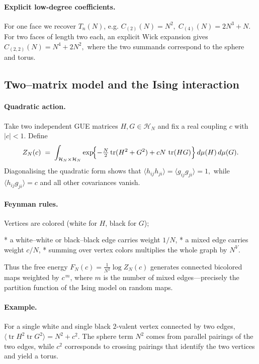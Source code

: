 \documentclass[letterpaper,11pt,oneside,reqno]{article}
\numberwithin{equation}{section}
\theoremstyle{definition}
\begin{document}
\paragraph{Explicit low-degree coefficients.}
For one face we recover $T_n(N)$, e.g.
\(
  C_{(2)}(N)=N^{2},\;
  C_{(4)}(N)=2N^{3}+N.
\)
For two faces of length two each, an explicit Wick expansion gives
\(
  C_{(2,2)}(N)=N^{4}+2N^{2},
\)
where the two summands correspond to the sphere and torus.

\subsection{Two–matrix model and the Ising interaction}
\label{subsec:ising}

\paragraph{Quadratic action.}
Take two independent GUE matrices
$H,G\in\mathcal H_N$ and fix a real coupling $c$ with
$|c|<1$.
Define
\[
   Z_N(c)\;=\;
   \int_{\mathcal H_N\times\mathcal H_N}
        \exp\!\Bigl\{
            -\tfrac{N}{2}\operatorname{tr}(H^{2}+G^{2})
            +cN\,\operatorname{tr}(HG)
          \Bigr\}\,d\mu(H)\,d\mu(G).
\]
Diagonalising the quadratic form shows that
\(
  \langle h_{ij}h_{ji}\rangle=\langle g_{ij}g_{ji}\rangle=1,
\)
while
\(
  \langle h_{ij}g_{ji}\rangle=c
\)
and all other covariances vanish.

\paragraph{Feynman rules.}
Vertices are colored (white for $H$, black for $G$);

* a white–white or black–black edge carries weight $1/N$,
* a mixed edge carries weight $c/N$,
* summing over vertex colors multiplies the whole graph by $N^{V}$.

Thus the free energy
$
  F_N(c)=\frac{1}{N^{2}}\log Z_N(c)
$
generates connected bicolored maps weighted by $c^{\,m}$,
where $m$ is the number of mixed edges—precisely the partition
function of the Ising model on random maps.

\paragraph{Example.}
For a single white and single black $2$-valent vertex connected by two
edges,
\(
  \langle\operatorname{tr}H^{2}\operatorname{tr}G^{2}\rangle
  =N^{2}+c^{2}.
\)
The sphere term $N^{2}$ comes from parallel pairings of the two edges,
while $c^{2}$ corresponds to crossing pairings that identify the two
vertices and yield a torus.
\end{document}

